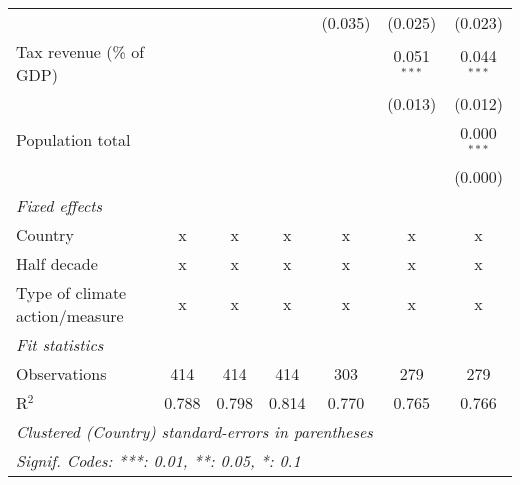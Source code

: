 \begin{tabular}{lcccccc}
                                                     &         &                &                & (0.035)        & (0.025)        & (0.023)\\   
   Tax revenue (\% of GDP)                           &         &                &                &                & 0.051$^{***}$  & 0.044$^{***}$\\   
                                                     &         &                &                &                & (0.013)        & (0.012)\\   
   Population total                                  &         &                &                &                &                & 0.000$^{***}$\\   
                                                     &         &                &                &                &                & (0.000)\\   
   \emph{Fixed effects}\\
   Country                                           & x       & x              & x              & x              & x              & x\\  
   Half decade                                       & x       & x              & x              & x              & x              & x\\  
   Type of climate action/measure                    & x       & x              & x              & x              & x              & x\\  
   \midrule \emph{Fit statistics}\\
   Observations                                      & 414     & 414            & 414            & 303            & 279            & 279\\  
   R$^2$                                             & 0.788   & 0.798          & 0.814          & 0.770          & 0.765          & 0.766\\  
   \midrule
   \multicolumn{7}{l}{\emph{Clustered (Country) standard-errors in parentheses}}\\
   \multicolumn{7}{l}{\emph{Signif. Codes: ***: 0.01, **: 0.05, *: 0.1}}\\
\end{tabular}
\par\endgroup


